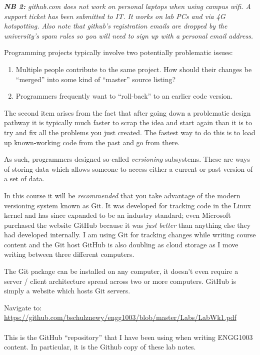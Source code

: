 \documentclass{lab}
\begin{document}
\textit{\textbf{NB 2:} github.com does not work on personal laptops when using campus wifi. A support ticket has been submitted to IT. It works on lab PCs and via 4G hotspotting. Also note that github's registration emails are dropped by the university's spam rules so you will need to sign up with a personal email address.}

Programming projects typically involve two potentially problematic issues:

\begin{enumerate}
	\item Multiple people contribute to the same project. How should their changes be ``merged'' into some kind of ``master'' source listing?
	\item Programmers frequently want to ``roll-back'' to an earlier code version.
\end{enumerate}

The second item arises from the fact that after going down a problematic design pathway it is typically much faster to scrap the idea and start again than it is to try and fix all the problems you just created. The fastest way to do this is to load up known-working code from the past and go from there.

As such, programmers designed so-called \textit{versioning} subsystems. These are ways of storing data which allows someone to access either a current or past version of a set of data.

In this course it will be \textit{recommended} that you take advantage of the modern versioning system known as Git. It was developed for tracking code in the Linux kernel and has since expanded to be an industry standard; even Microsoft purchased the website GitHub because it was \textit{just better} than anything else they had developed internally. I am using Git for tracking changes while writing course content and the Git host GitHub is also doubling as cloud storage as I move writing between three different computers.

The Git package can be installed on any computer, it doesn't even require a server / client architecture spread across two or more computers. GitHub is simply a website which hosts Git servers.

\begin{task}{}{} Navigate to:\\ \url{https://github.com/bschulznewy/engg1003/blob/master/Labs/LabWk1.pdf}
\\ \\ 
This is the GitHub ``repository'' that I have been using when writing ENGG1003 content. In particular, it is the Github copy of these lab notes.
\end{task}
\end{document}
